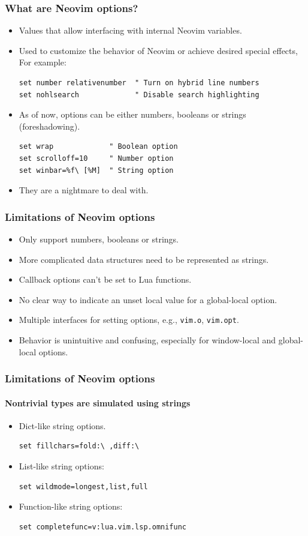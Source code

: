 \documentclass[10pt]{beamer}
\begin{document}
\begin{frame}[fragile]
\frametitle{What are Neovim options?}
\begin{itemize}
    \item Values that allow interfacing with internal Neovim variables.
    \item Used to customize the behavior of Neovim or achieve desired special effects, For example:
\begin{lstlisting}
set number relativenumber  " Turn on hybrid line numbers
set nohlsearch             " Disable search highlighting
\end{lstlisting}
    \item As of now, options can be either numbers, booleans or strings (foreshadowing).
\begin{lstlisting}
set wrap             " Boolean option
set scrolloff=10     " Number option
set winbar=%f\ [%M]  " String option
\end{lstlisting}
\pause
    \item They are a nightmare to deal with.
\end{itemize}
\end{frame}
\begin{frame}
\frametitle{Limitations of Neovim options}
\begin{itemize}
    \item Only support numbers, booleans or strings.
    \item More complicated data structures need to be represented as strings.
    \item Callback options can't be set to Lua functions.
    \item No clear way to indicate an unset local value for a global-local option.
    \item Multiple interfaces for setting options, e.g., \lstinline{vim.o}, \lstinline{vim.opt}.
    \item Behavior is unintuitive and confusing, especially for window-local and global-local
    options.
\end{itemize}
\end{frame}
\begin{frame}[fragile]
\frametitle{Limitations of Neovim options}
\framesubtitle{Nontrivial types are simulated using strings}
\begin{itemize}
    \item Dict-like string options.
\begin{lstlisting}
set fillchars=fold:\ ,diff:\ 
\end{lstlisting}
    \item List-like string options:
\begin{lstlisting}
set wildmode=longest,list,full 
\end{lstlisting}
    \item Function-like string options:
\begin{lstlisting}
set completefunc=v:lua.vim.lsp.omnifunc
\end{lstlisting}
\end{itemize}
\end{frame}
\end{document}
